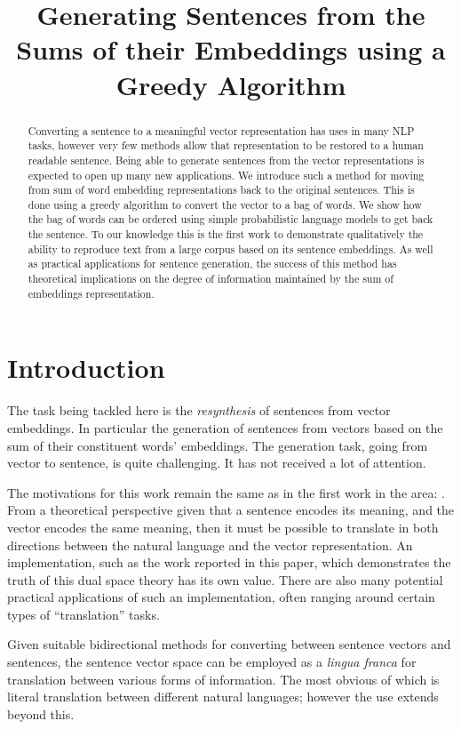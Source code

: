 \documentclass[11pt]{article}
\title{Generating Sentences from the Sums of their Embeddings using a Greedy Algorithm}
\author{}
\theoremstyle{plain}
\theoremstyle{definition}
\begin{document}
\maketitle

\begin{abstract}
Converting a sentence to a meaningful vector representation has uses in many NLP tasks, however very few methods allow that representation to be restored to a human readable sentence. Being able to generate sentences from the vector representations is expected to open up many new applications. We introduce such a method for moving from sum of word embedding representations back to the original sentences. This is done using a greedy algorithm to convert the vector to a bag of words. We show how the bag of words can be ordered using simple probabilistic language models to get back the sentence. To our knowledge this is the first work to demonstrate qualitatively the ability to reproduce text from a large corpus based on its sentence embeddings. 
As well as practical applications for sentence generation, the success of this method has theoretical implications on the degree of information maintained by the sum of embeddings representation.
\end{abstract}

\section{Introduction} \label{intro}


The task being tackled here is the \emph{resynthesis} of sentences from vector embeddings. In particular the generation of sentences from vectors based on the sum of their constituent words' embeddings. The generation task, going from vector to sentence, is quite challenging. It has not received a lot of attention.

The motivations for this work remain the same as in the first work in the area: \textcite{Dinu2014CompositionalGeneration}. From a theoretical perspective given that a sentence encodes its meaning, and the vector encodes the same meaning, then it must be possible to translate in both directions between the natural language and the vector representation. An implementation, such as the work reported in this paper, which demonstrates the truth of this dual space theory has its own value. There are also many potential practical applications of such an implementation, often ranging around certain types of ``translation'' tasks.

Given suitable bidirectional methods for converting between sentence vectors and sentences, the sentence vector space can be employed as a \emph{lingua franca} for translation between various forms of information. The most obvious of which is literal translation between different natural languages; however the use extends beyond this.
\end{document}
